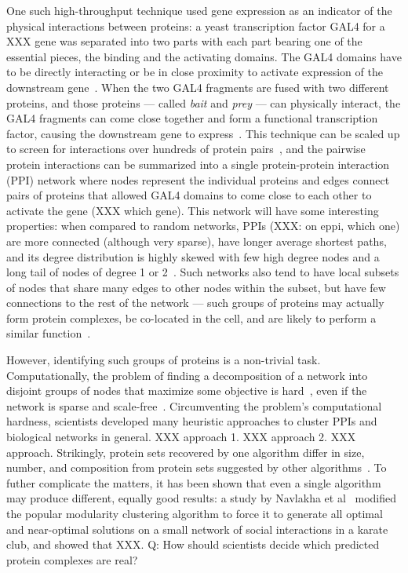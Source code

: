 One such high-throughput technique used gene expression as an indicator of the physical interactions between proteins: a yeast transcription factor GAL4 for a XXX gene was separated into two parts with each part bearing one of the essential pieces, the binding and the activating domains. The GAL4 domains have to be directly interacting or be in close proximity to activate expression of the downstream gene~\cite{XXX}. When the two GAL4 fragments are fused with two different proteins, and those proteins --- called \textit{bait} and \textit{prey} --- can physically interact, the GAL4 fragments can come close together and form a functional transcription factor, causing the downstream gene to express~\cite{XXX}. This technique can be scaled up to screen for interactions over hundreds of protein pairs~\cite{Ito 2001}, and the pairwise protein interactions can be summarized into a single protein-protein interaction (PPI) network where nodes represent the individual proteins and edges connect pairs of proteins that allowed GAL4 domains to come close to each other to activate the gene (XXX which gene). This network will have some interesting properties: when compared to random networks, PPIs (XXX: on eppi, which one) are more connected (although very sparse), have longer average shortest paths, and its degree distribution is highly skewed with few high degree nodes and a long tail of nodes of degree 1 or 2~\cite{Zhu et al 2007}. Such networks also tend to have local subsets of nodes that share many edges to other nodes within the subset, but have few connections to the rest of the network --- such groups of proteins may actually form protein complexes, be co-located in the cell, and are likely to perform a similar function~\cite{ProteinComplexesPPI}.



However, identifying such groups of proteins is a non-trivial task. Computationally, the problem of finding a decomposition of a network into disjoint groups of nodes that maximize some objective is hard~\cite{ModularityNPhard}, even if the network is sparse and scale-free~\cite{XXX}. Circumventing the problem's computational hardness, scientists developed many heuristic approaches to cluster PPIs and biological networks in general. XXX approach 1. XXX approach 2. XXX approach. Strikingly, protein sets recovered by one algorithm differ in size, number, and composition from protein sets suggested by other algorithms~\cite{blah}. To futher complicate the matters, it has been shown that even a single algorithm may produce different, equally good results: a study by Navlakha et al~\cite{SaketModularity} modified the popular modularity clustering algorithm to force it to generate all optimal and near-optimal solutions on a small network of social interactions in a karate club, and showed that XXX. Q: How should scientists decide which predicted protein complexes are real?

